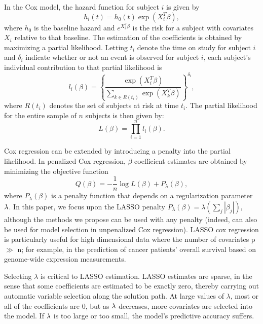 In the Cox model, the hazard function for subject $i$ is given by 
\begin{equation}
  h_{i}(t) = h_{0}(t) \exp( X_{i}^{T} \beta),
\end{equation} 
where $h_{0}$ is the baseline hazard and $e^{X_i^{T} \beta}$ is the risk for a subject with covariates $X_i$ relative to that baseline.  The estimation of the coefficients is obtained by maximizing a partial likelihood.  Letting $t_i$ denote the time on study for subject $i$ and $\delta_{i}$ indicate whether or not an event is observed for subject $i$, each subject's individual contribution to that partial likelihood is
\begin{equation}
  l_{i}(\beta) = \left \{\frac{\exp ( X_{i}^{T} \beta)}{\sum_{ k \in R(t_{i})}\exp ( X_{k}^{T} \beta)}\right \}^{\delta_{i}},
\end{equation}
where $R(t_{i})$ denotes the set of subjects at risk at time $t_{i}$.  The partial likelihood for the entire sample of $n$ subjects is then given by:
\begin{equation}
  L(\beta) =\prod_{i = 1}^{n} l_{i}(\beta).
\end{equation}

Cox regression can be extended by introducing a penalty into the partial likelihood.  In penalized Cox regression, $\beta$ coefficient estimates are obtained by minimizing the objective function
\begin{equation}
  Q(\beta) = - \frac{1}{n} \log L(\beta) + P_{\lambda}(\beta),
\end{equation}
where $P_{\lambda}(\beta)$ is a penalty function that depends on a regularization parameter $\lambda$. In this paper, we focus upon the LASSO penalty $P_{\lambda}(\beta) = \lambda (\sum_{j} |\beta_{j}|)$, although the methods we propose can be used with any penalty (indeed, can also be used for model selection in unpenalized Cox regression).  LASSO cox regression is particularly useful for high dimensional data where the number of covariates p $\gg$ n; for example, in the prediction of cancer patients' overall survival based on genome-wide expression measurements.

Selecting $\lambda$ is critical to LASSO estimation. LASSO estimates are sparse, in the sense that some coefficients are estimated to be exactly zero, thereby carrying out automatic variable selection along the solution path. At large values of $\lambda$, most or all of the coefficients are 0, but as $\lambda$ decreases, more covariates are selected into the model. If $\lambda$ is too large or too small, the model's predictive accuracy suffers.

